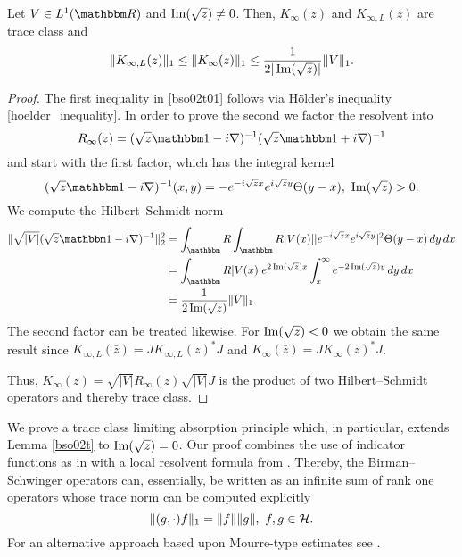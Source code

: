 \begin{lemma}\label{bso02t}
Let $V\in L^1(\R)$ and $\operatorname{Im}(\sqrt{z})\neq 0$. Then, $K_\infty(z)$ and $K_{\infty,L}(z)$
are trace class and
\begin{equation}\label{bso02t01}
  \|K_{\infty,L}(z)\|_1 \leq \| K_\infty(z)\|_1 \leq \frac{1}{2|\operatorname{Im}(\sqrt{z})|} \|V\|_1 .
\end{equation}
\end{lemma}
\begin{proof}
The first inequality in \eqref{bso02t01} follows via H\"older's inequality \eqref{hoelder_inequality}.
In order to prove the second we factor the resolvent into
\begin{equation*}
   R_\infty(z) = ( \sqrt{z}\id - i\nabla)^{-1}(\sqrt{z}\id + i\nabla)^{-1}
\end{equation*}
and start with the first factor, which has the integral kernel
\begin{equation*}
  (\sqrt{z}\id - i\nabla)^{-1}(x,y) = - e^{-i\sqrt{z}x}e^{i\sqrt{z}y} \Theta(y-x),
   \ \im(\sqrt{z})>0 .
\end{equation*}
We compute the Hilbert--Schmidt norm
\begin{equation*}
\begin{split}
\|\sqrt{|V|}(\sqrt{z}\id-i\nabla)^{-1}\|_2^2
     & = \int_\R\int_\R |V(x)| | e^{-i\sqrt{z}x}e^{i\sqrt{z}y} |^2
          \Theta(y-x)\, dy \, dx  \\
     & = \int_\R |V(x)| e^{2\im(\sqrt{z})x} \int_x^\infty e^{-2\im(\sqrt{z})y}\, dy\, dx\\
     & = \frac{1}{2\im(\sqrt{z})}\|V\|_1 .
\end{split}
\end{equation*}
The second factor can be treated likewise. 
For $\operatorname{Im}(\sqrt{z})<0$ we obtain the same result since $K_{\infty,L}(\bar{z}) = J K_{\infty,L}(z)^*J$ and $K_{\infty}(\bar{z}) = J K_{\infty}(z)^*J$.

Thus, $K_\infty(z)=\sqrt{|V|}R_\infty(z)\sqrt{|V|}J$ is the product of two Hilbert--Schmidt operators and thereby trace class.
\end{proof}

We prove a trace class limiting absorption principle which, in particular, extends Lemma \ref{bso02t}
to $\operatorname{Im}(\sqrt{z})=0$. Our proof combines the use of indicator functions as in \cite[Prop. 5.6]{Simon2005} with a
local resolvent formula from \cite{Froese1997}. Thereby, the Birman--Schwinger operators can, essentially, be written as an infinite 
sum of rank one operators whose trace norm can be computed explicitly
\begin{equation}\label{trace_norm_rank_one}
  \|(g,\cdot)f\|_1 = \|f\| \|g\|,\ f,g\in{\mathcal H} .
\end{equation}
For an alternative approach based upon Mourre-type estimates see \cite[Thm. 6.1]{Sobolev1993}.

